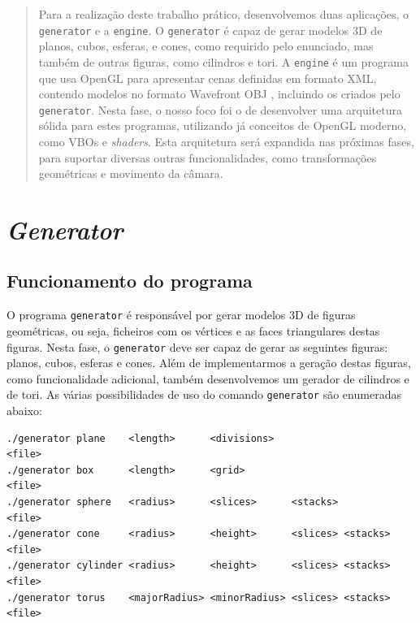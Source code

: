 \documentclass[12pt, a4paper]{article}
\begin{document}
\pagebreak

\begin{abstract}
    Para a realização deste trabalho prático, desenvolvemos duas aplicações, o \texttt{generator} e
    a \texttt{engine}. O \texttt{generator} é capaz de gerar modelos 3D de planos, cubos, esferas,
    e cones, como requirido pelo enunciado, mas também de outras figuras, como cilindros e tori. A
    \texttt{engine} é um programa que usa OpenGL \cite{opengl} para apresentar cenas definidas em
    formato XML, contendo modelos no formato Wavefront OBJ \cite{wavefront-obj}, incluindo os
    criados pelo \texttt{generator}. Nesta fase, o nosso foco foi o de desenvolver uma arquitetura
    sólida para estes programas, utilizando já conceitos de OpenGL moderno, como VBOs e
    \emph{shaders}. Esta arquitetura será expandida nas próximas fases, para suportar diversas
    outras funcionalidades, como transformações geométricas e movimento da câmara.
\end{abstract}

\section{\emph{Generator}}

\subsection{Funcionamento do programa}

O programa \texttt{generator} é responsável por gerar modelos 3D de figuras geométricas, ou seja,
ficheiros com os vértices e as faces triangulares destas figuras. Nesta fase, o \texttt{generator}
deve ser capaz de gerar as seguintes figuras: planos, cubos, esferas e cones. Além de implementarmos
a geração destas figuras, como funcionalidade adicional, também desenvolvemos um gerador de
cilindros e de tori. As várias possibilidades de uso do comando \texttt{generator} são enumeradas
abaixo:

\begin{verbatim}
./generator plane    <length>      <divisions>                     <file>
./generator box      <length>      <grid>                          <file>
./generator sphere   <radius>      <slices>      <stacks>          <file>
./generator cone     <radius>      <height>      <slices> <stacks> <file>
./generator cylinder <radius>      <height>      <slices> <stacks> <file>
./generator torus    <majorRadius> <minorRadius> <slices> <stacks> <file>
\end{verbatim}
\end{document}
